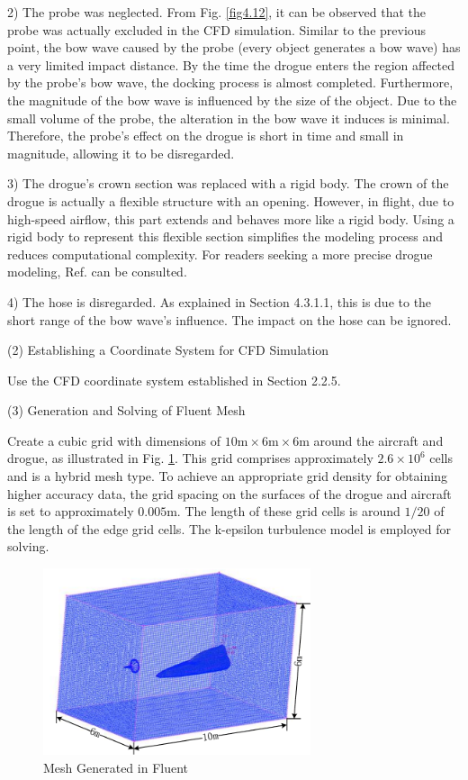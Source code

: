 2) The probe was neglected. From Fig. \ref{fig4.12}, it can be observed that the probe was actually excluded in the CFD simulation. Similar to the previous point, the bow wave caused by the probe (every object generates a bow wave) has a very limited impact distance. By the time the drogue enters the region affected by the probe's bow wave, the docking process is almost completed. Furthermore, the magnitude of the bow wave is influenced by the size of the object. Due to the small volume of the probe, the alteration in the bow wave it induces is minimal. Therefore, the probe's effect on the drogue is short in time and small in magnitude, allowing it to be disregarded.

3) The drogue's crown section was replaced with a rigid body. The crown of the drogue is actually a flexible structure with an opening. However, in flight, due to high-speed airflow, this part extends and behaves more like a rigid body. Using a rigid body to represent this flexible section simplifies the modeling process and reduces computational complexity. For readers seeking a more precise drogue modeling, Ref. \cite{ro_aerodynamic_2007} can be consulted.

4) The hose is disregarded. As explained in Section 4.3.1.1, this is due to the short range of the bow wave's influence. The impact on the hose can be ignored.

(2) Establishing a Coordinate System for CFD Simulation

Use the CFD coordinate system established in Section 2.2.5.

(3) Generation and Solving of Fluent Mesh

Create a cubic grid with dimensions of $10\text{m} \times 6\text{m} \times 6\text{m}$ around the aircraft and drogue, as illustrated in Fig. \ref{fig4.13}. This grid comprises approximately $2.6 \times {10^6}$ cells and is a hybrid mesh type. To achieve an appropriate grid density for obtaining higher accuracy data, the grid spacing on the surfaces of the drogue and aircraft is set to approximately $0.005\text{m}$. The length of these grid cells is around $1/20$ of the length of the edge grid cells. The k-epsilon turbulence model is employed for solving.
\begin{figure}[th]
	\centering
	\includegraphics[width=0.7\textwidth]{Figures/Figs_Ch4/fig16.pdf}
	\caption{Mesh Generated in Fluent}\label{fig4.13}
\end{figure}

